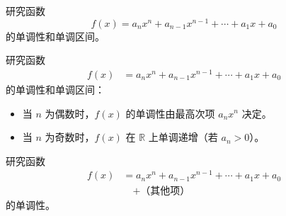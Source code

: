 \documentclass[UTF8]{ctexart}
\begin{document}
研究函数
\begin{equation}
f(x) = a_n x^n + a_{n-1} x^{n-1} + \cdots + a_1 x + a_0
\label{eq:polynomial}
\end{equation}
的单调性和单调区间。


研究函数
\begin{align}
f(x) &= a_n x^n + a_{n-1} x^{n-1} + \cdots + a_1 x + a_0 \label{eq:poly_align}
\end{align}
的单调性和单调区间：
\begin{itemize}
    \item 当 \( n \) 为偶数时，\( f(x) \) 的单调性由最高次项 \( a_n x^n \) 决定。
    \item 当 \( n \) 为奇数时，\( f(x) \) 在 \( \mathbb{R} \) 上单调递增（若 \( a_n > 0 \)）。
\end{itemize}



研究函数
\begin{equation}
\begin{split}
f(x) &= a_n x^n + a_{n-1} x^{n-1} + \cdots + a_1 x + a_0 \\
     &\quad + \text{（其他项）}
\end{split}
\label{eq:poly_split}
\end{equation}
的单调性。
\end{document}

